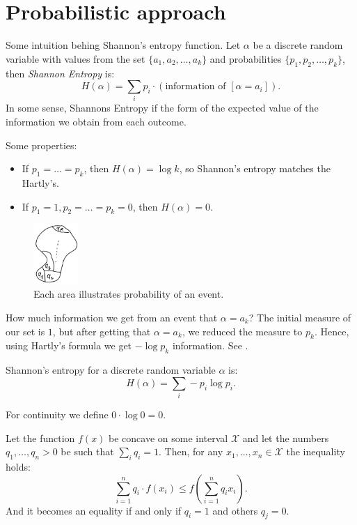
\section{Probabilistic approach}

Some intuition behing Shannon's entropy function.
Let $\alpha$ be a discrete random variable with values from the set $\{a_1, a_2, \ldots, a_k\}$ and probabilities $\{p_1, p_2, \ldots, p_k\}$, then \emph{Shannon Entropy} is:
\[
    H(\alpha) = \sum_i p_i \cdot (\text{information of } [\alpha = a_i]).
\]
In some sense, Shannons Entropy if the form of the expected value of the information we obtain from each outcome.

Some properties:
\begin{itemize}
    \item If $p_1 = \dots = p_k$, then $H(\alpha) = \log k$, so Shannon's entropy matches the Hartly's.
    \item If $p_1 = 1, p_2 = \dots = p_k = 0$, then $H(\alpha) = 0$.
\end{itemize}

\begin{figure}[H]
    \centering
    \includegraphics[width=0.15\textwidth]{figures/42D86984-D9AD-47FE-A062-3B83675568DA}
    \caption{Each area illustrates probability of an event.}
    \label{fig:42d86984-d9ad-47fe-a062-3b83675568da}
\end{figure}

How much information we get from an event that $\alpha = a_k$?
The initial measure of our set is $1$, but after getting that $\alpha = a_k$, we reduced the measure to $p_k$.
Hence, using Hartly's formula we get $-\log p_k$ information.
See .

\begin{definition}[1948]
    Shannon's entropy for a discrete random variable $\alpha$ is:
    \[
        H(\alpha) = \sum_i - p_i \log p_i.
    \]
\end{definition}
For continuity we define $0 \cdot \log 0 = 0$.

\begin{theorem}
    \label{thm:jensen}
    Let the function $f(x)$ be concave on some interval $\mathcal X$ and let the numbers $q_1, \ldots, q_n > 0$ be such that $\sum_i q_i = 1$.
    Then, for any $x_1, \ldots, x_n \in \mathcal X$ the inequality holds:
    \[
        \sum_{i = 1}^n q_i \cdot f(x_i) \leq f\left(\sum_{i = 1}^n q_i x_i\right).
    \]
    And it becomes an equality if and only if $q_i = 1$ and others $q_j = 0$.
\end{theorem}

